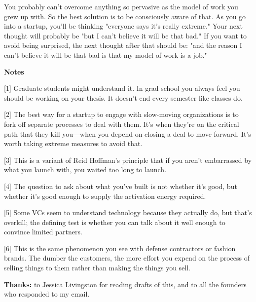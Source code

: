 You probably can't
                  overcome anything so pervasive as the model of work you grew
                  up with. So the best solution is to be consciously aware of
                  that. As you go into a startup, you'll be thinking "everyone
                  says it's really extreme." Your next thought will probably be
                  "but I can't believe it will be that bad." If you want to
                  avoid being surprised, the next thought after that should be:
                  "and the reason I can't believe it will be that bad is that my
                  model of work is a job."








                  \textbf{Notes}

[1] Graduate students might understand it. In grad school you
                  always feel you should be working on your thesis. It doesn't
                  end every semester like classes do.

[2] The best way for a startup to engage with slow-moving
                  organizations is to fork off separate processes to deal with
                  them. It's when they're on the critical path that they kill
                  you---when you depend on closing a deal to move forward.
                  It's worth taking extreme measures to avoid that.

[3] This is a variant of Reid Hoffman's principle that if you
                  aren't embarrassed by what you launch with, you waited too
                  long to launch.

[4] The question to ask about what you've built is not whether
                  it's good, but whether it's good enough to supply the
                  activation energy required.

[5] Some VCs seem to understand technology because they
                  actually do, but that's overkill; the defining test is whether
                  you can talk about it well enough to convince limited
                  partners.

[6] This is the same phenomenon you see with defense
                  contractors or fashion brands. The dumber the customers, the
                  more effort you expend on the process of selling things to
                  them rather than making the things you sell.

\textbf{Thanks:}
                  to Jessica Livingston for reading drafts of this, and to all
                  the founders who responded to my email.




